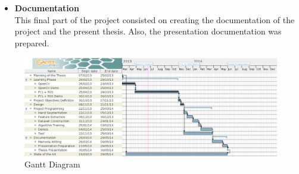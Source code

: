 \begin{appendices}
\begin{itemize}
			 	\item{\textbf{Documentation}}\\
			 	This final part of the project consisted on creating the documentation of the project and the present thesis. Also, the presentation documentation was prepared. 
			 	\\
		 \end{itemize}

		\begin{figure}[H]
			\centering
		    \includegraphics[scale=0.5, angle=90]{img/gantt.eps}
			\caption[Gantt Diagram]{Gantt Diagram}	
		\end{figure}

\end{appendices}